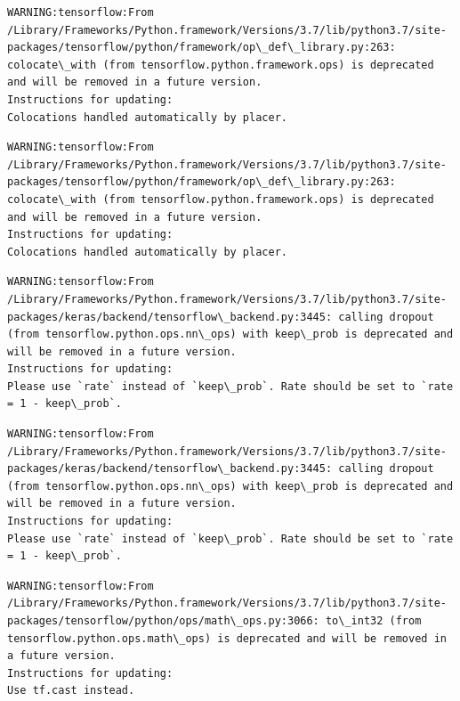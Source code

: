 \documentclass[11pt]{article}
\begin{document}
    \begin{Verbatim}[commandchars=\\\{\}]
WARNING:tensorflow:From /Library/Frameworks/Python.framework/Versions/3.7/lib/python3.7/site-packages/tensorflow/python/framework/op\_def\_library.py:263: colocate\_with (from tensorflow.python.framework.ops) is deprecated and will be removed in a future version.
Instructions for updating:
Colocations handled automatically by placer.

    \end{Verbatim}

    \begin{Verbatim}[commandchars=\\\{\}]
WARNING:tensorflow:From /Library/Frameworks/Python.framework/Versions/3.7/lib/python3.7/site-packages/tensorflow/python/framework/op\_def\_library.py:263: colocate\_with (from tensorflow.python.framework.ops) is deprecated and will be removed in a future version.
Instructions for updating:
Colocations handled automatically by placer.

    \end{Verbatim}

    \begin{Verbatim}[commandchars=\\\{\}]
WARNING:tensorflow:From /Library/Frameworks/Python.framework/Versions/3.7/lib/python3.7/site-packages/keras/backend/tensorflow\_backend.py:3445: calling dropout (from tensorflow.python.ops.nn\_ops) with keep\_prob is deprecated and will be removed in a future version.
Instructions for updating:
Please use `rate` instead of `keep\_prob`. Rate should be set to `rate = 1 - keep\_prob`.

    \end{Verbatim}

    \begin{Verbatim}[commandchars=\\\{\}]
WARNING:tensorflow:From /Library/Frameworks/Python.framework/Versions/3.7/lib/python3.7/site-packages/keras/backend/tensorflow\_backend.py:3445: calling dropout (from tensorflow.python.ops.nn\_ops) with keep\_prob is deprecated and will be removed in a future version.
Instructions for updating:
Please use `rate` instead of `keep\_prob`. Rate should be set to `rate = 1 - keep\_prob`.

    \end{Verbatim}

    \begin{Verbatim}[commandchars=\\\{\}]
WARNING:tensorflow:From /Library/Frameworks/Python.framework/Versions/3.7/lib/python3.7/site-packages/tensorflow/python/ops/math\_ops.py:3066: to\_int32 (from tensorflow.python.ops.math\_ops) is deprecated and will be removed in a future version.
Instructions for updating:
Use tf.cast instead.

    \end{Verbatim}
\end{document}
